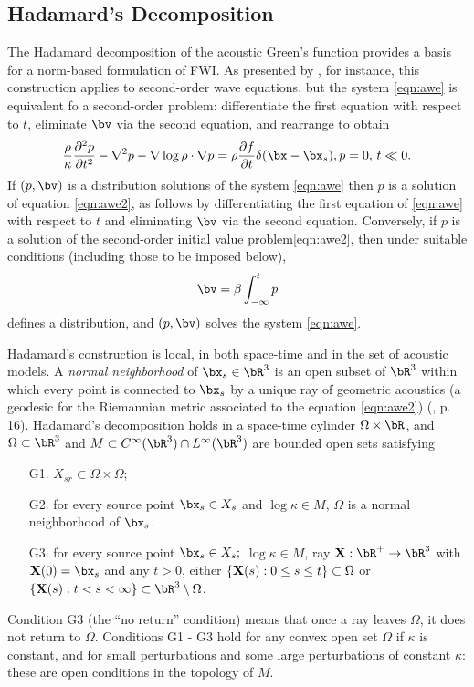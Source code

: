 \subsection{Hadamard's Decomposition}
The Hadamard decomposition of the acoustic Green's function \cite[]{Friedlander:75,Qian:JCP24} provides a
basis for a norm-based formulation of FWI. As presented by
\cite{Friedlander:75}, for instance, this construction applies to
second-order wave equations, but the system \ref{eqn:awe} is
equivalent fo a second-order problem: differentiate the first equation
with respect to $t$, eliminate $\bv$ via the second equation, and
rearrange to obtain
\begin{equation}
  \label{eqn:awe2}
  \frac{\rho}{\kappa}\frac{\partial^2 p}{\partial t^2} - \nabla^2 p -
  \nabla \log \rho \cdot \nabla p = \rho \frac{\partial f}{\partial t}
  \delta(\bx-\bx_s), \nonumber \\
  p=0, \, t \ll 0.
\end{equation}
If $(p,\bv)$ is a distribution solutions of the system
\ref{eqn:awe} then $p$ is a solution of equation
\ref{eqn:awe2}, as follows by differentiating the first equation of
\ref{eqn:awe} with respect to $t$ and eliminating $\bv$ via the second
equation. Conversely, if $p$ is a solution of the second-order initial
value problem\ref{eqn:awe2}, then under suitable conditions (including
those to be imposed below),
\[
  \bv = \beta \int_{-\infty}^t p
\]
defines a distribution, and $(p,\bv)$ solves the system \ref{eqn:awe}.

Hadamard's construction is local, in both space-time and in the set of
acoustic models. A {\em normal neighborhood} of
$\bx_s \in \bR^3$ is an open subset of $\bR^3$ 
within which every point is connected to $\bx_s$ by  a unique ray of
geometric acoustics (a geodesic for the Riemannian metric associated
to the equation \ref{eqn:awe2}) (\cite{Friedlander:75},
p. 16). Hadamard's decomposition holds in a space-time cylinder
$\Omega \times \bR$,  and $\Omega\subset \bR^3$ 
and $M \subset C^{\infty}(\bR^3) \cap L^{\infty}(\bR^3)$ are bounded open sets satisfying 
\begin{itemize}
  \item[G1. ] $X_{sr} \subset \Omega \times \Omega$;
  \item[G2. ] for every source point $\bx_s\in X_{s}$ and $\log \kappa \in M$, $\Omega$ is a
    normal neighborhood of $\bx_s$.
  \item[G3. ] for every source point $\bx_s \in X_{s};$
    $\log \kappa \in M$, ray ${\bf X}:\bR^+\rightarrow \bR^3$
    with ${\bf X}(0)=\bx_s$ and any $t>0$, either $\{{\bf X}(s): 0\le s \le t\} \subset \Omega$
    or $\{{\bf X}(s): t < s < \infty\} \subset \bR^3 \setminus \Omega$.
  \end{itemize}
Condition G3 (the ``no return'' condition) means that once a ray
leaves $\Omega$, it does not return to $\Omega$. Conditions G1 - G3
hold for any convex open set $\Omega$ if $\kappa$ is constant, and for small perturbations and some
large perturbations of constant $\kappa$: these are open conditions in
the topology of $M$.

